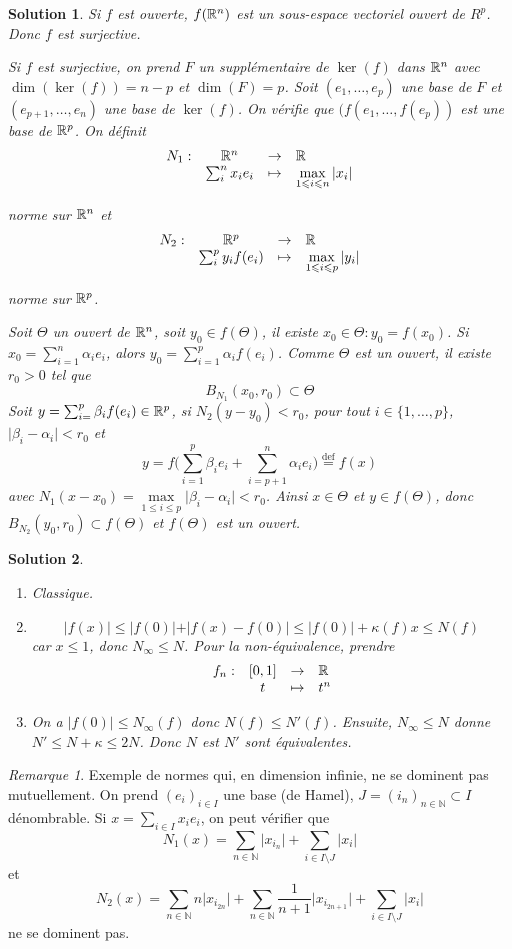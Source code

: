 \documentclass[12pt]{article}
\newtheorem{solution}{Solution}[section]
\theoremstyle{remark}
\newtheorem{remark}{Remarque}[section]
\newcommand{\N}{\mathbb{N}} \newcommand{\Z}{\mathbb{Z}}
\newcommand{\function}[5]{
	$$
	\begin{array}{rccl}
		#1: & #2 & \to & #3 \\
		& #4 & \mapsto & #5
	\end{array}
	$$
}
\numberwithin{equation}{section}
\begin{document}
\begin{solution}
	Si $f$ est ouverte, $f(\mathbb{R}^{n})$ est un sous-espace vectoriel ouvert de $R^{p}$. Donc $f$ est surjective.

	Si $f$ est surjective, on prend $F$ un supplémentaire de $\ker(f)$ dans $\mathbb{R}^{n}$ avec $\dim(\ker(f))=n-p$ et $\dim(F)=p$. Soit $(e_{1},\dots,e_{p})$ une base de $F$ et $(e_{p+1},\dots,e_{n})$ une base de $\ker(f)$. On vérifie que $(f(e_{1},\dots,f(e_{p}))$ est une base de $\mathbb{R}^{p}$. On définit \function{N_1}{\R^n}{\R}{\sum_{i}^{n}x_{i}e_{i}}{\max\limits_{1\leqslant i\leqslant n}\vert x_{i}\vert}
	norme sur $\mathbb{R}^{n}$ et \function{N_2}{\R^p}{\R}{\sum_{i}^{p}y_{i}f(e_{i})}{\max\limits_{1\leqslant i\leqslant p}\vert y_{i}\vert}
	norme sur $\mathbb{R}^{p}$.

	Soit $\Theta$ un ouvert de $\mathbb{R}^{n}$, soit $y_{0}\in f(\Theta)$, il existe $x_{0}\in\Theta\colon y_{0}=f(x_{0})$. Si $x_{0}=\sum_{i=1}^{n}\alpha_{i}e_{i}$, alors $y_{0}=\sum_{i=1}^{p}\alpha_{i}f(e_{i})$. Comme $\Theta$ est un ouvert, il existe $r_{0}>0$ tel que 
	$$B_{N_{1}}(x_{0},r_{0})\subset\Theta$$
	Soit $y=\sum_{i=}^{p}\beta_{i}f(e_{i})\in\mathbb{R}^{p}$, si $N_{2}(y-y_{0})<r_{0}$, pour tout $i\in\{1,\dots,p\}$, $\vert\beta_{i}-\alpha_{i}\vert<r_{0}$ et 
	$$y=f\Biggl(\sum_{i=1}^{p}\beta_{i}e_{i}+\sum_{i=p+1}^{n}\alpha_{i}e_{i}\Biggr)\overset{\text{def}}{=}f(x)$$
	avec $N_{1}(x-x_{0})=\max\limits_{1\leqslant i\leqslant p}\vert\beta_{i}-\alpha_{i}\vert<r_{0}$. Ainsi $x\in\Theta$ et $y\in f(\Theta)$, donc $B_{N_{2}}(y_{0},r_{0})\subset f(\Theta)$ et $f(\Theta)$ est un ouvert.
\end{solution}

\begin{solution}
	\phantom{}
	\begin{enumerate}
		\item Classique.
		\item $$\vert f(x)\vert\leqslant\vert f(0)\vert+\vert f(x)-f(0)\vert\leqslant\vert f(0)\vert+\kappa(f)x\leqslant N(f)$$
		car $x\leqslant 1$, donc $N_{\infty}\leqslant N$. Pour la non-équivalence, prendre \function{f_n}{[0,1]}{\R}{t}{t^n}
		\item On a $\vert f(0)\vert\leqslant N_{\infty}(f)$ donc $N(f)\leqslant N'(f)$. Ensuite, $N_{\infty}\leqslant N$ donne $N'\leqslant N+\kappa\leqslant 2N$. Donc $N$ est $N'$ sont équivalentes.
	\end{enumerate}
\end{solution}

\begin{remark}
	Exemple de normes qui, en dimension infinie, ne se dominent pas mutuellement. On prend $(e_{i})_{i\in I}$ une base (de Hamel), $J=(i_{n})_{n\in\N}\subset I$ dénombrable. Si $x=\sum_{i\in I}x_{i}e_{i}$, on peut vérifier que 
	$$N_{1}(x)=\sum_{n\in\N}\vert x_{i_{n}}\vert+\sum_{i\in I\setminus J}\vert x_{i}\vert$$
	et
	$$N_{2}(x)=\sum_{n\in\N}n\vert x_{i_{2n}}\vert+\sum_{n\in\N}\frac{1}{n+1}\bigl\lvert x_{i_{2n+1}}\bigr\rvert+\sum_{i\in I\setminus J}\vert x_{i}\vert$$
	ne se dominent pas.
\end{remark}
\end{document}
